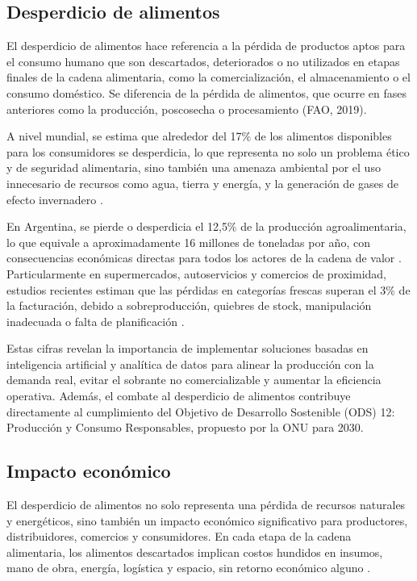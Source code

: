 \subsection{Desperdicio de alimentos}

El desperdicio de alimentos hace referencia a la pérdida de productos aptos para el consumo humano que son descartados, deteriorados o no utilizados en etapas finales de la cadena alimentaria, como la comercialización, el almacenamiento o el consumo doméstico. Se diferencia de la pérdida de alimentos, que ocurre en fases anteriores como la producción, poscosecha o procesamiento (FAO, 2019).

A nivel mundial, se estima que alrededor del 17\% de los alimentos disponibles para los consumidores se desperdicia, lo que representa no solo un problema ético y de seguridad alimentaria, sino también una amenaza ambiental por el uso innecesario de recursos como agua, tierra y energía, y la generación de gases de efecto invernadero \parencite{unep2021}.

En Argentina, se pierde o desperdicia el 12{,}5\% de la producción agroalimentaria, lo que equivale a aproximadamente 16 millones de toneladas por año, con consecuencias económicas directas para todos los actores de la cadena de valor \parencite{tiscornia2022}. Particularmente en supermercados, autoservicios y comercios de proximidad, estudios recientes estiman que las pérdidas en categorías frescas superan el 3\% de la facturación, debido a sobreproducción, quiebres de stock, manipulación inadecuada o falta de planificación \parencite{weteam2021}.

Estas cifras revelan la importancia de implementar soluciones basadas en inteligencia artificial y analítica de datos para alinear la producción con la demanda real, evitar el sobrante no comercializable y aumentar la eficiencia operativa. Además, el combate al desperdicio de alimentos contribuye directamente al cumplimiento del Objetivo de Desarrollo Sostenible (ODS) 12: Producción y Consumo Responsables, propuesto por la ONU para 2030.

\subsection{Impacto económico}

El desperdicio de alimentos no solo representa una pérdida de recursos naturales y energéticos, sino también un impacto económico significativo para productores, distribuidores, comercios y consumidores. En cada etapa de la cadena alimentaria, los alimentos descartados implican costos hundidos en insumos, mano de obra, energía, logística y espacio, sin retorno económico alguno \parencite{gustavsson2011}.

